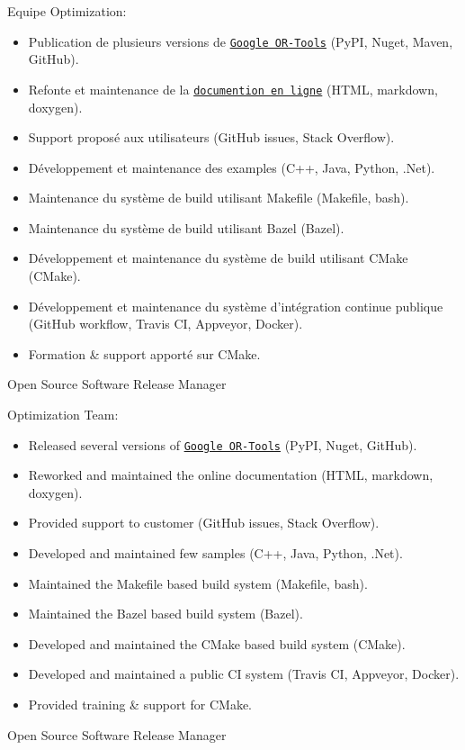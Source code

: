 \documentclass{article}
\begin{document}
\begin{llist}
{Equipe Optimization:
\vspace{-0.33cm}
\begin{itemize}
	\item Publication de plusieurs versions de
		\href{https://github.com/google/or-tools}{\texttt{Google OR-Tools}} (PyPI, Nuget, Maven, GitHub).
  \item Refonte et maintenance de la \href{https://developers.google.com/optimization/}{\texttt{documention en ligne}} (HTML, markdown, doxygen).
  \item Support propos\'{e} aux utilisateurs (GitHub issues, Stack Overflow).
  \item D\'{e}veloppement et maintenance des examples (C++, Java, Python, .Net).
  \item Maintenance du syst\`{e}me de build utilisant Makefile (Makefile, bash).
  \item Maintenance du syst\`{e}me de build utilisant Bazel (Bazel).
  \item D\'{e}veloppement et maintenance du syst\`{e}me de build utilisant CMake (CMake).
  \item D\'{e}veloppement et maintenance du syst\`{e}me d'int\'{e}gration continue publique (GitHub workflow, Travis CI, Appveyor, Docker).
  \item Formation \& support apport\'{e} sur CMake.
\end{itemize}
}

 {
} {
}
 {
Open Source Software Release Manager\\
\vspace{-0.33cm}

Optimization Team:
\vspace{-0.33cm}
\begin{itemize}
	\item Released several versions of \href{https://github.com/google/or-tools}{\texttt{Google OR-Tools}} (PyPI, Nuget, GitHub).
	\item Reworked and maintained the online documentation (HTML, markdown, doxygen).
	\item Provided support to customer (GitHub issues, Stack Overflow).
	\item Developed and maintained few samples (C++, Java, Python, .Net).
	\item Maintained the Makefile based build system (Makefile, bash).
	\item Maintained the Bazel based build system (Bazel).
	\item Developed and maintained the CMake based build system (CMake).
	\item Developed and maintained a public CI system (Travis CI, Appveyor, Docker).
	\item Provided training \& support for CMake.
\end{itemize}
} {
Open Source Software Release Manager\\
\vspace{-0.33cm}

}
\end{llist}
\end{document}
